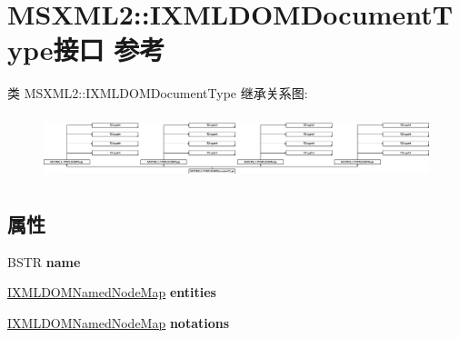 \hypertarget{interface_m_s_x_m_l2_1_1_i_x_m_l_d_o_m_document_type}{}\section{M\+S\+X\+M\+L2\+:\+:I\+X\+M\+L\+D\+O\+M\+Document\+Type接口 参考}
\label{interface_m_s_x_m_l2_1_1_i_x_m_l_d_o_m_document_type}
类 M\+S\+X\+M\+L2\+:\+:I\+X\+M\+L\+D\+O\+M\+Document\+Type 继承关系图\+:\begin{figure}[H]
\begin{center}
\leavevmode
\includegraphics[height=1.883408cm]{interface_m_s_x_m_l2_1_1_i_x_m_l_d_o_m_document_type}
\end{center}
\end{figure}
\subsection*{属性}
\begin{DoxyCompactItemize}
\item 
\mbox{\label{interface_m_s_x_m_l2_1_1_i_x_m_l_d_o_m_document_type_ad89e9b99cdbbb02508b24efa85883035}} 
B\+S\+TR {\bfseries name}
\item 
\mbox{\label{interface_m_s_x_m_l2_1_1_i_x_m_l_d_o_m_document_type_aa99188c4db0b9cbf9ec49e4053637b3b}} 
\hyperlink{interface_m_s_x_m_l2_1_1_i_x_m_l_d_o_m_named_node_map}{I\+X\+M\+L\+D\+O\+M\+Named\+Node\+Map} {\bfseries entities}
\item 
\mbox{\label{interface_m_s_x_m_l2_1_1_i_x_m_l_d_o_m_document_type_a2ef8c52e55f9c93ca90ca97102c35336}} 
\hyperlink{interface_m_s_x_m_l2_1_1_i_x_m_l_d_o_m_named_node_map}{I\+X\+M\+L\+D\+O\+M\+Named\+Node\+Map} {\bfseries notations}
\end{DoxyCompactItemize}
